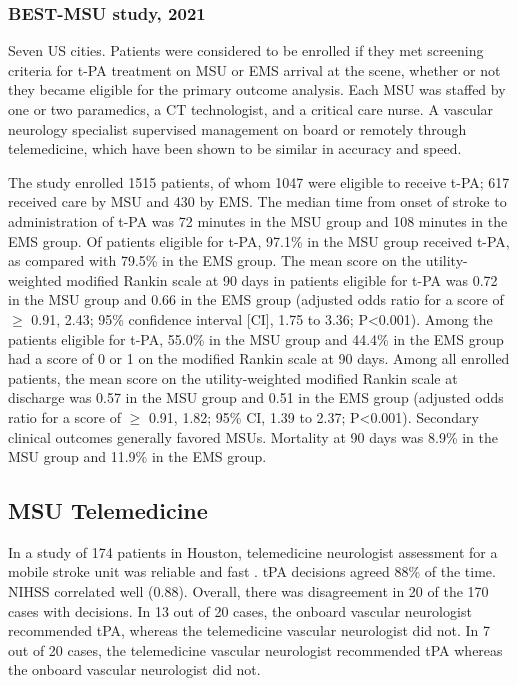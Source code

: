 \subsubsection{BEST-MSU study, 2021 \cite{grotta_prospective_2021}}

Seven US cities. Patients were considered to be enrolled if they met screening criteria for t-PA treatment on MSU or EMS arrival at the scene, whether or not they became eligible for the primary outcome analysis. Each MSU was staffed by one or two paramedics, a CT technologist, and a critical care nurse. A vascular neurology specialist supervised management on board or remotely through telemedicine, which have been shown to be similar in accuracy and speed.

The study enrolled 1515 patients, of whom 1047 were eligible to receive t-PA; 617 received care by MSU and 430 by EMS. The median time from onset of stroke to administration of t-PA was 72 minutes in the MSU group and 108 minutes in the EMS group. Of patients eligible for t-PA, 97.1\% in the MSU group received t-PA, as compared with 79.5\% in the EMS group. The mean score on the utility-weighted modified Rankin scale at 90 days in patients eligible for t-PA was 0.72 in the MSU group and 0.66 in the EMS group (adjusted odds ratio for a score of $\ge$ 0.91, 2.43; 95\% confidence interval [CI], 1.75 to 3.36; P<0.001). Among the patients eligible for t-PA, 55.0\% in the MSU group and 44.4\% in the EMS group had a score of 0 or 1 on the modified Rankin scale at 90 days. Among all enrolled patients, the mean score on the utility-weighted modified Rankin scale at discharge was 0.57 in the MSU group and 0.51 in the EMS group (adjusted odds ratio for a score of  $\ge$ 0.91, 1.82; 95\% CI, 1.39 to 2.37; P<0.001). Secondary clinical outcomes generally favored MSUs. Mortality at 90 days was 8.9\% in the MSU group and 11.9\% in the EMS group.

\subsection{MSU Telemedicine}

In a study of 174 patients in Houston, telemedicine neurologist assessment for a mobile stroke unit was reliable and fast \cite{wu_telemedicine_2017} . tPA decisions agreed 88\% of the time. NIHSS correlated well (0.88). Overall, there was disagreement in 20 of the 170 cases with decisions. In 13 out of 20 cases, the onboard vascular neurologist recommended tPA, whereas the telemedicine vascular neurologist did not. In 7 out of 20 cases, the telemedicine vascular neurologist recommended tPA whereas the onboard vascular neurologist did not. 

